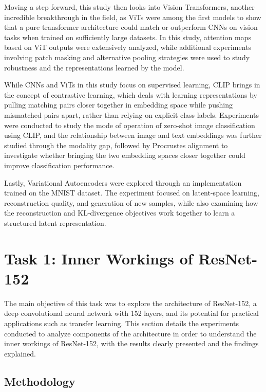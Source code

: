 \documentclass{article}
\begin{document}
Moving a step forward, this study then looks into Vision Transformers, another incredible breakthrough in the field, as ViTs were among the first models to show that a pure transformer architecture could match or outperform CNNs on vision tasks when trained on sufficiently large datasets. In this study, attention maps based on ViT outputs were extensively analyzed, while additional experiments involving patch masking and alternative pooling strategies were used to study robustness and the representations learned by the model.

While CNNs and ViTs in this study focus on supervised learning, CLIP brings in the concept of contrastive learning, which deals with learning representations by pulling matching pairs closer together in embedding space while pushing mismatched pairs apart, rather than relying on explicit class labels. Experiments were conducted to study the mode of operation of zero-shot image classification using CLIP, and the relationship between image and text embeddings was further studied through the modality gap, followed by Procrustes alignment to investigate whether bringing the two embedding spaces closer together could improve classification performance.

Lastly, Variational Autoencoders were explored through an implementation trained on the MNIST dataset. The experiment focused on latent-space learning, reconstruction quality, and generation of new samples, while also examining how the reconstruction and KL-divergence objectives work together to learn a structured latent representation. 

\section{Task 1: Inner Workings of ResNet-152}
The main objective of this task was to explore the architecture of ResNet-152, a deep convolutional neural network with 152 layers, and its potential for practical applications such as transfer learning. This section details the experiments conducted to analyze components of the architecture in order to understand the inner workings of ResNet-152, with the results clearly presented and the findings explained.
\subsection{Methodology}
\end{document}
